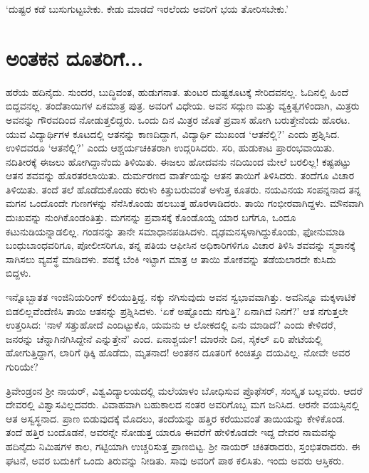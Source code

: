 ‘ದುಷ್ಟರ ಕಡೆ ಬುಸುಗುಟ್ಟಬೇಕು. ಕೇಡು ಮಾಡದೆ ಇರಲೆಂದು ಅವರಿಗೆ ಭಯ ತೋರಿಸಬೇಕು.’


\section*{ಅಂತಕನ ದೂತರಿಗೆ...}


ಹರೆಯ ಹದಿನೈದು. ಸುಂದರ, ಬುದ್ಧಿವಂತ, ಹುಡುಗನಾತ. ತುಂಟರ ದುಷ್ಟಕೂಟಕ್ಕೆ ಸೇರಿದವನಲ್ಲ. ಓದಿನಲ್ಲಿ ಹಿಂದೆ ಬಿದ್ದವನಲ್ಲ. ತಂದೆತಾಯಿಗಳ ಏಕಮಾತ್ರ ಪುತ್ರ. ಅವರಿಗೆ ವಿಧೇಯ. ಅವನ ಸದ್ಗುಣ ಮತ್ತು ವ್ಯಕ್ತಿತ್ವಗಳಿಂದಾಗಿ, ಮಿತ್ರರು ಅವನನ್ನು ಗೌರವದಿಂದ ನೋಡುತ್ತಲಿದ್ದರು. ಒಂದು ದಿನ ಮಿತ್ರರ ಜೊತೆ ಪ್ರವಾಸ ಹೋಗಿ ಬರುತ್ತೇನೆಂದು ಹೊರಟ. ಯುವ ವಿದ್ಯಾರ್ಥಿಗಳ ಕೂಟದಲ್ಲಿ ಆತನನ್ನು ಕಾಣದಿದ್ದಾಗ, ವಿದ್ಯಾರ್ಥಿ ಮುಖಂಡ ‘ಆತನೆಲ್ಲಿ?’ ಎಂದು ಪ್ರಶ್ನಿಸಿದ. ಉಳಿದವರೂ ‘ಆತನೆಲ್ಲಿ?’ ಎಂದು ಆಶ್ಚರ್ಯಚಕಿತರಾಗಿ ಉದ್ಗರಿಸಿದರು. ಸರಿ, ಹುಡುಕಾಟ ಪ್ರಾರಂಭ\-ವಾಯಿತು. ನದಿತೀರಕ್ಕೆ ಈಜಲು ಹೋಗಿದ್ದಾನೆಂದು ತಿಳಿಯಿತು. ಈಜಲು ಹೋದವನು ನದಿಯಿಂದ ಮೇಲೆ ಬರಲಿಲ್ಲ! ಕಷ್ಟಪಟ್ಟು ಆತನ ಶವವನ್ನು ಹೊರತರಲಾಯಿತು. ದುರ್ಮರಣದ ವಾರ್ತೆಯನ್ನು ಆತನ ತಾಯಿಗೆ ತಿಳಿಸಿದರು. ತಂದೆಗೂ ವಿಚಾರ ತಿಳಿಯಿತು. ತಂದೆ ತಲೆ ಹೊಡೆದುಕೊಂಡು ಕರುಳು ಕಿತ್ತುಬರುವಂತೆ ಅಳುತ್ತ ಕೂತರು. ನಯವಿನಯ ಸಂಪನ್ನನಾದ ತನ್ನ ಮಗನ ಒಂದೊಂದೇ ಗುಣಗಳನ್ನು ನೆನೆಸಿಕೊಂಡು ಹಲಬುತ್ತ ಹೊರಳಾಡಿದರು. ತಾಯಿ ಗಂಭೀರವಾಗಿದ್ದಳು. ಮೌನವಾಗಿ ದುಃಖವನ್ನು ನುಂಗಿಕೊಂಡಂತಿತ್ತು. ಮಗನನ್ನು ಪ್ರವಾಸಕ್ಕೆ ಕೊಂಡೊಯ್ದ ಯಾರ ಬಗೆಗೂ, ಒಂದೂ ಕಟುನುಡಿಯನ್ನಾಡಲಿಲ್ಲ. ಗಂಡನನ್ನು ತಾನೇ ಸಮಾಧಾನ\-ಪಡಿಸಿದಳು. ದೃಢಮನಸ್ಕಳಾಗಿದ್ದುಕೊಂಡು, ಫೋನುಮಾಡಿ ಬಂಧುಬಾಂಧವರಿಗೂ, ಪೋಲೀಸ\-ರಿಗೂ, ತನ್ನ ಪತಿಯ ಆಫೀಸಿನ ಅಧಿಕಾರಿಗಳಿಗೂ ವಿಚಾರ ತಿಳಿಸಿ ಶವವನ್ನು ಸ್ಮಶಾನಕ್ಕೆ ಸಾಗಿಸಲು ವ್ಯವಸ್ಥೆ ಮಾಡಿದಳು. ಶವಕ್ಕೆ ಬೆಂಕಿ ಇಟ್ಟಾಗ ಮಾತ್ರ ಆ ತಾಯಿ ಶೋಕವನ್ನು ತಡೆಯಲಾರದೇ ಕುಸಿದು ಬಿದ್ದಳು.

ಇನ್ನೊಬ್ಬಾತತ ಇಂಜಿನಿಯರಿಂಗ್ ಕಲಿಯುತ್ತಿದ್ದ. ನಕ್ಕು ನಗಿಸುವುದು ಅವನ ಸ್ವಭಾವವಾಗಿತ್ತು. ಅವನಿನ್ನೂ ಮಕ್ಕಳಾಟಿಕೆ ಬಿಡಲಿಲ್ಲವೆಂದೆಣಿಸಿ ತಾಯಿ ಆತನನ್ನು ಪ್ರಶ್ನಿಸಿದಳು. ‘ಏಕೆ ಅಷ್ಟೊಂದು ನಗುತ್ತಿ? ಏನಾಗಿದೆ ನಿನಗೆ?’ ಆತ ನಗುತ್ತಲೇ ಉತ್ತರಿಸಿದ: ‘ನಾಳೆ ಸತ್ತುಹೋದೆ ಎಂದಿಟ್ಟುಕೊ, ಯಮನು ಆ ಲೋಕದಲ್ಲಿ ಏನು ಮಾಡಿದೆ? ಎಂದು ಕೇಳಿದರೆ, ಜನರನ್ನು ಚೆನ್ನಾಗಿ\break ನಗಿಸಿದ್ದೇನೆ ಎನ್ನುತ್ತೇನೆ’ ಎಂದ. ಏನಾಶ್ಚರ್ಯ! ಮಾರನೇ ದಿನ, ಸೈಕಲ್ ಏರಿ ಪೇಟೆಯಲ್ಲಿ ಹೋಗುತ್ತಿದ್ದಾಗ, ಲಾರಿಗೆ ಢಿಕ್ಕಿ ಹೊಡೆದು, ಮೃತನಾದ! ಅಂತಕನ ದೂತರಿಗೆ ಕಿಂಚಿತ್ತೂ ದಯವಿಲ್ಲ. ನೋವೇ ಅವರ ಗುರಿಯೇ?

ತ್ರಿವೇಂಡ್ರಂನ ಶ‍್ರೀ ನಾಯರ್, ವಿಶ್ವವಿದ್ಯಾಲಯದಲ್ಲಿ ಮಲೆಯಾಳಂ ಬೋಧಿಸುವ ಪ್ರೊಫೆಸರ್, ಸಂಸ್ಕೃತ ಬಲ್ಲವರು. ಆದರೆ ದೇವರಲ್ಲಿ ವಿಶ್ವಾಸವಿಲ್ಲದವರು. ವಿವಾಹವಾಗಿ ಬಹುಕಾಲದ ನಂತರ ಅವರಿಗೊಬ್ಬ ಮಗ ಜನಿಸಿದ. ಆರನೇ ವಯಸ್ಸಿನಲ್ಲಿ ಆತ ಅಸ್ವಸ್ಥನಾದ. ಪ್ರಾಣ ಬಿಡುವುದಕ್ಕೆ ಮೊದಲು, ತಂದೆಯನ್ನು ಹತ್ತಿರ ಕರೆಯುವಂತೆ ತಾಯಿಯನ್ನು ಕೇಳಿಕೊಂಡ. ತಂದೆ ಹತ್ತಿರ ಬಂದೊಡನೆ, ಅವರನ್ನೇ ನೋಡುತ್ತ ಯಾರೂ ಈವರೆಗೆ ಹೇಳಿಕೊಡದೇ ಇದ್ದ ದೇವರ ನಾಮವನ್ನು ಹದಿನೈದು ನಿಮಿಷಗಳ ಕಾಲ, ಗಟ್ಟಿಯಾಗಿ ಉಚ್ಚರಿಸುತ್ತ ಪ್ರಾಣಬಿಟ್ಟ. ಶ‍್ರೀ ನಾಯರ್ ಚಕಿತ\-ರಾದರು, ಸ್ತಂಭಿತರಾದರು. ಈ ಘಟನೆ, ಅವರ ಬದುಕಿಗೆ ಒಂದು ತಿರುವನ್ನು ನೀಡಿತು. ಸಾವು ಅವರಿಗೆ ಪಾಠ ಕಲಿಸಿತು. ಇಂದು ಅವರು ಆಸ್ತಿಕರು.

